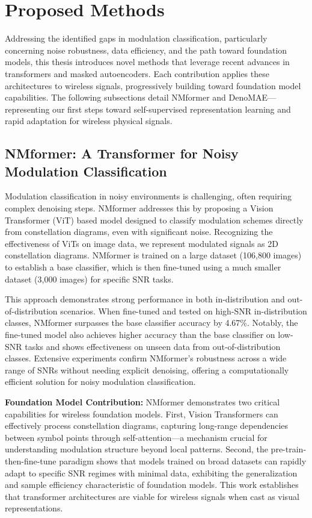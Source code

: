 \section{Proposed Methods}
\label{sec:proposed_methods}

Addressing the identified gaps in modulation classification, particularly concerning noise robustness, data efficiency, and the path toward foundation models, this thesis introduces novel methods that leverage recent advances in transformers and masked autoencoders. Each contribution applies these architectures to wireless signals, progressively building toward foundation model capabilities. The following subsections detail NMformer and DenoMAE—representing our first steps toward self-supervised representation learning and rapid adaptation for wireless physical signals.

\subsection{NMformer: A Transformer for Noisy Modulation Classification}\label{sec:nmformer}

Modulation classification in noisy environments is challenging, often requiring complex denoising steps. NMformer addresses this by proposing a Vision Transformer (ViT) based model designed to classify modulation schemes directly from constellation diagrams, even with significant noise. Recognizing the effectiveness of ViTs on image data, we represent modulated signals as 2D constellation diagrams. NMformer is trained on a large dataset (106,800 images) to establish a base classifier, which is then fine-tuned using a much smaller dataset (3,000 images) for specific SNR tasks.

This approach demonstrates strong performance in both in-distribution and out-of-distribution scenarios. When fine-tuned and tested on high-SNR in-distribution classes, NMformer surpasses the base classifier accuracy by 4.67\%. Notably, the fine-tuned model also achieves higher accuracy than the base classifier on low-SNR tasks and shows effectiveness on unseen data from out-of-distribution classes. Extensive experiments confirm NMformer's robustness across a wide range of SNRs without needing explicit denoising, offering a computationally efficient solution for noisy modulation classification.

\textbf{Foundation Model Contribution:} NMformer demonstrates two critical capabilities for wireless foundation models. First, Vision Transformers can effectively process constellation diagrams, capturing long-range dependencies between symbol points through self-attention—a mechanism crucial for understanding modulation structure beyond local patterns. Second, the pre-train-then-fine-tune paradigm shows that models trained on broad datasets can rapidly adapt to specific SNR regimes with minimal data, exhibiting the generalization and sample efficiency characteristic of foundation models. This work establishes that transformer architectures are viable for wireless signals when cast as visual representations.

